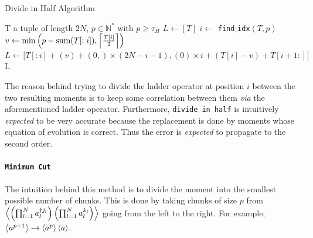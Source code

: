 \begin{algorithm}
\caption{Divide in Half Algorithm}\label{alg:divide-in-half}
\begin{algorithmic}
\Require T a tuple of length $2 N$, $p \in \mathbb{N}^*$ with $p \ge \tau_H$
\State $L \gets [T]$
\Else
\State $i \gets$ \texttt{find$\_$idx}$(T, p)$ 
\State $v\gets \min\left(p - \text{sum}(T[:i]), \left\lceil \frac{T[i]}{2} \right\rceil\right)$ 
\State $L \gets \big[T[:i] + (v) + (0,)\times(2N-i-1), (0)\times i + (T[i] - v) + T[i+1:]\big]$
\EndIf
\State \Return L
\end{algorithmic}
\end{algorithm}

The reason behind trying to divide the ladder operator at position $i$ between the two resulting moments is to keep some correlation between them \textit{via} the aforementioned ladder operator. Furthermore, \texttt{divide in half} is intuitively \textit{expected} to be very accurate because the replacement is done by moments whose equation of evolution is correct. Thus the error is \textit{expected} to propagate to the second order.

\paragraph{\texttt{Minimum Cut}}  \label{min-cut}
The intuition behind this method is to divide the moment into the smallest possible number of chunks. This is done by taking chunks of size $p$ from $\left\langle \left(\prod_{l=1}^N a^{\dagger j_l}_l\right) \left(\prod_{l=1}^N a^{k_l}_l\right) \right\rangle$ going from the left to the right. For example, $\left\langle a^{p+1} \right\rangle \mapsto \left\langle a^{p} \right\rangle \left\langle a \right\rangle$.

